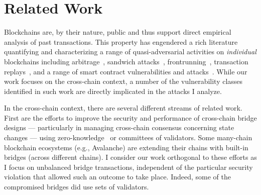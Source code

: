 \section{Related Work}


Blockchains are, by their nature, public and thus support direct
empirical analysis of past transactions.  This property has engendered a rich
literature quantifying and characterizing a range of quasi-adversarial
activities on \emph{individual} blockchains including
arbitrage~\cite{mclaughlin2023large, qin2022quantifying}, sandwich
attacks~\cite{qin2022quantifying, zhou2021high},
frontrunning~\cite{daian2020flash}, transaction
replays~\cite{qin2022quantifying}, and a range of smart contract
vulnerabilities and attacks~\cite{perez2021smart,grossman2017online,
  rodler2018sereum, zhang2020txspector, wu2021defiranger,
  ferreira2021eye}.  While our work focuses on the cross-chain
context, a number of the vulnerability classes
identified in such work are directly implicated in the attacks I analyze.%





In the cross-chain context, there are several different streams of
related work.  First are the efforts to improve the security and
performance of cross-chain bridge designs --- particularly in managing
cross-chain consensus concerning state changes --- using
zero-knowledge~\cite{xie2022zkbridge} or committees of
validators\cite{lan2021horizon,li2022polybridge}.
Some many-chain blockchain ecosystems (e.g., Avalanche) are extending
their chains with built-in bridges (across different chains). I consider our
work orthogonal to these efforts as I focus on unbalanced bridge transactions, independent of the particular
security violation that allowed such an outcome to take place.
Indeed, some of the compromised bridges did use sets of validators.

